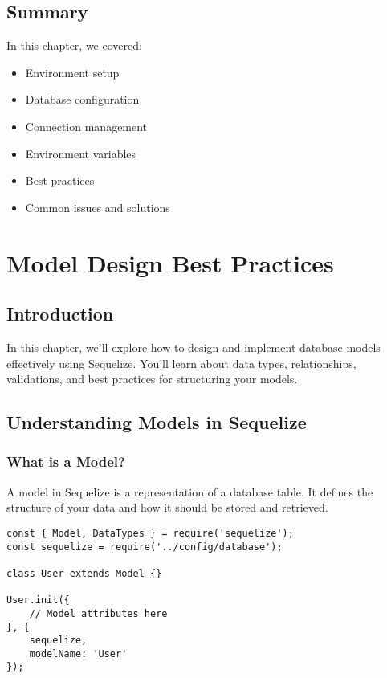 \documentclass[12pt,a4paper]{book}
\begin{document}
	\section{Summary}
	In this chapter, we covered:
	\begin{itemize}
		\item Environment setup
		\item Database configuration
		\item Connection management
		\item Environment variables
		\item Best practices
		\item Common issues and solutions
	\end{itemize}
	
	\chapter{Model Design Best Practices}
	
	\section{Introduction}
	In this chapter, we'll explore how to design and implement database models effectively using Sequelize. You'll learn about data types, relationships, validations, and best practices for structuring your models.
	
	\section{Understanding Models in Sequelize}
	
	\subsection{What is a Model?}
	A model in Sequelize is a representation of a database table. It defines the structure of your data and how it should be stored and retrieved.
	
	\begin{tcolorbox}[title=Basic Model Structure]
		\begin{verbatim}
const { Model, DataTypes } = require('sequelize');
const sequelize = require('../config/database');

class User extends Model {}

User.init({
	// Model attributes here
}, {
	sequelize,
	modelName: 'User'
});
		\end{verbatim}
	\end{tcolorbox}
	
\end{document}
